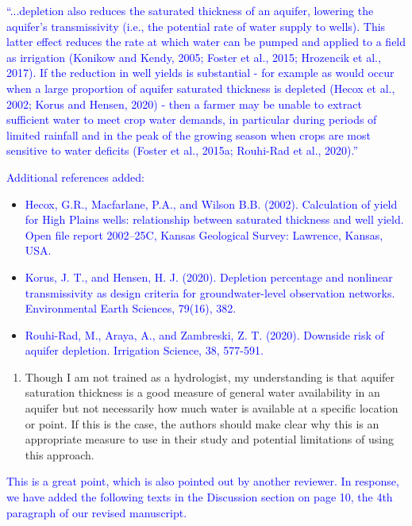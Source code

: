 \documentclass[
]{article}
\providecommand{\tightlist}{%
  \setlength{\itemsep}{0pt}\setlength{\parskip}{0pt}}
\begin{document}
\textcolor{blue}{``...depletion also reduces the saturated thickness of an aquifer, lowering the aquifer's transmissivity (i.e., the potential rate of water supply to wells). This latter effect reduces the rate at which water can be pumped and applied to a field as irrigation (Konikow and Kendy, 2005; Foster et al., 2015; Hrozencik et al., 2017). If the reduction in well yields is substantial - for example as would occur when a large proportion of aquifer saturated thickness is depleted (Hecox et al., 2002; Korus and Hensen, 2020) - then a farmer may be unable to extract sufficient water to meet crop water demands, in particular during periods of limited rainfall and in the peak of the growing season when crops are most sensitive to water deficits (Foster et al., 2015a; Rouhi-Rad et al., 2020).''
}

\textcolor{blue}{Additional references added:}

\begin{itemize}
\item
  \textcolor{blue}{Hecox, G.R., Macfarlane, P.A., and Wilson B.B. (2002). Calculation of yield for High Plains wells: relationship between saturated thickness and well yield. Open file report 2002–25C, Kansas Geological Survey: Lawrence, Kansas, USA.}
\item
  \textcolor{blue}{Korus, J. T., and Hensen, H. J. (2020). Depletion percentage and nonlinear transmissivity as design criteria for groundwater-level observation networks. Environmental Earth Sciences, 79(16), 382.}
\item
  \textcolor{blue}{Rouhi-Rad, M., Araya, A., and Zambreski, Z. T. (2020). Downside risk of aquifer depletion. Irrigation Science, 38, 577-591.}
\end{itemize}

\begin{enumerate}
\def\labelenumi{\arabic{enumi}.}
\setcounter{enumi}{1}
\tightlist
\item
  Though I am not trained as a hydrologist, my understanding is that
  aquifer saturation thickness is a good measure of general water
  availability in an aquifer but not necessarily how much water is
  available at a specific location or point. If this is the case, the
  authors should make clear why this is an appropriate measure to use in
  their study and potential limitations of using this approach.
\end{enumerate}

\textcolor{blue}{This is a great point, which is also pointed out by another reviewer. In response, we have added the following texts in the Discussion section on page 10, the 4th paragraph of our revised manuscript.}
\end{document}
